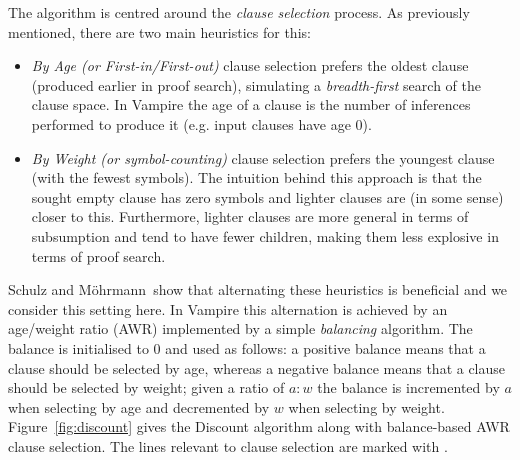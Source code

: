 \documentclass{llncs}
\newcommand{\sandm}{Schulz and M{\"{o}}hrmann}
\begin{document}
The algorithm is centred around the \emph{clause selection} process. As previously mentioned, there are two main heuristics for this:
\begin{itemize}
	\item \emph{By Age (or First-in/First-out)} clause selection prefers the oldest clause (produced earlier in proof search), simulating a \emph{breadth-first} search of the clause space. In Vampire the age of a clause is the number of inferences performed to produce it (e.g. input clauses have age 0).
	\item \emph{By Weight (or symbol-counting)} clause selection prefers the youngest clause (with the fewest symbols). The intuition behind this approach is that the sought empty clause has zero symbols and lighter clauses are (in some sense) closer to this. Furthermore, lighter clauses are more general in terms of subsumption and tend to have fewer children, making them less explosive in terms of proof search.
\end{itemize}
\sandm~show that alternating these heuristics is beneficial and we consider this setting here. In Vampire this alternation is achieved by an age/weight ratio (AWR) implemented by a simple \emph{balancing} algorithm. The balance is initialised to 0 and used as follows: a positive balance means that a clause should be selected by age, whereas a negative balance means that a clause should be selected by weight; given a ratio of $a:w$ the balance is incremented by $a$ when selecting by age and decremented by $w$ when selecting by weight.
Figure~\ref{fig:discount} gives the Discount algorithm along with balance-based AWR clause selection. The lines relevant to clause selection are marked with \Mark.
\end{document}
